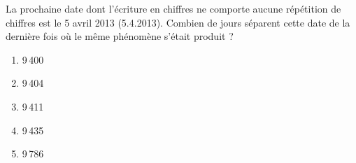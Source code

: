 La prochaine date dont l'écriture en chiffres ne comporte aucune répétition de chiffres est le 5 avril 2013 (5.4.2013). Combien de jours séparent cette date de la dernière fois où le même phénomène s'était produit ?
\begin{multicols}{5}
  \begin{enumerate}[A/]
  \item 9\,400
  \item 9\,404
  \item 9\,411
  \item 9\,435
  \item 9\,786
  \end{enumerate}
\end{multicols}